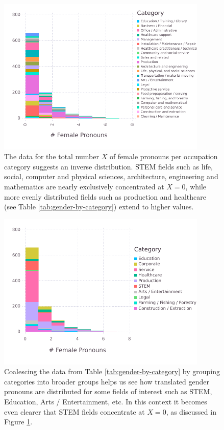 \documentclass[fleqn,10pt]{article}
\begin{document}
\begin{figure}[H]
	\centering
	\includegraphics[width=10cm]{pictures/histogram-female}
	\caption{The data for the total number $X$ of female pronouns per occupation category suggests an inverse distribution. STEM fields such as life, social, computer and physical sciences, architecture, engineering and mathematics are nearly exclusively concentrated at $X=0$, while more evenly distributed fields such as production and healthcare (see Table \ref{tab:gender-by-category}) extend to higher values.}
	\label{fig:histogram-female}
\end{figure}

\begin{figure}[H]
	\centering
	\includegraphics[width=10cm]{pictures/histogram-female-grouped}
	\caption{Coalescing the data from Table \ref{tab:gender-by-category} by grouping categories into broader groups helps us see how translated gender pronouns are distributed for some fields of interest such as STEM, Education, Arts / Entertainment, etc. In this context it becomes even clearer that STEM fields concentrate at $X = 0$, as discussed in Figure \ref{fig:histogram-female}.}
	\label{fig:histogram-female-grouped}
\end{figure}
\end{document}

